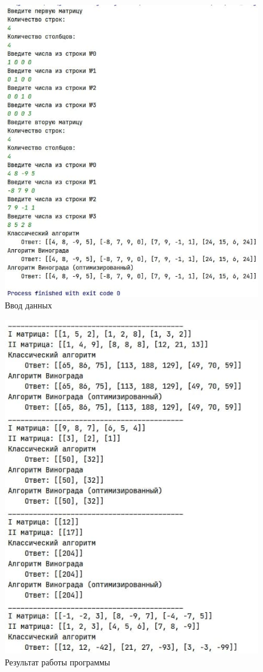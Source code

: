 \documentclass[12pt]{report}
\begin{document}
    \begin{figure}[H]
        \centering
        \includegraphics[width=0.7\linewidth]{img/example1}
        \caption{Ввод данных}
        \label{fig:example1}
    \end{figure}

    \begin{figure}[H]
        \centering
        \includegraphics[width=0.7\linewidth]{img/example2}
        \caption{Результат работы программы}
        \label{fig:example2}
    \end{figure}
\end{document}
